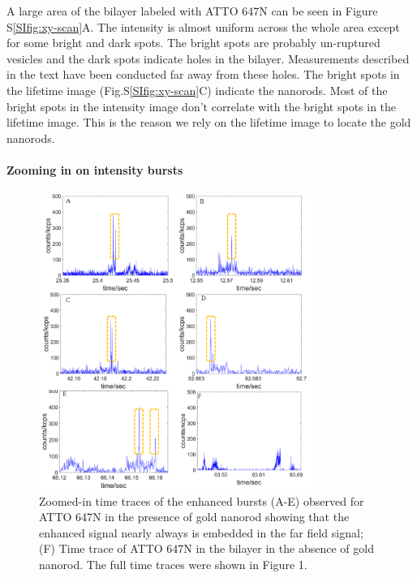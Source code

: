 A large area of the bilayer labeled with ATTO 647N can be seen in Figure S\ref{SIfig:xy-scan}A.
The intensity is almost uniform across the whole area except for some bright and dark spots.
The bright spots are probably un-ruptured vesicles and the dark spots indicate holes in the bilayer.
Measurements described in the text have been conducted far away from these holes.
The bright spots in the lifetime image (Fig.S\ref{SIfig:xy-scan}C) indicate the nanorods.
Most of the bright spots in the intensity image don't correlate with the bright spots in the lifetime image.
This is the reason we rely on the lifetime image to locate the gold nanorods.

\paragraph*{Zooming in on intensity bursts}
\begin{figure}%
  \centering
  \includegraphics[width=0.8\textwidth]{zoomed_traces}
  \makeatletter
  \renewcommand{\fnum@figure}{\figurename~S\thefigure}
  \makeatother{}
  \caption{Zoomed-in time traces of the enhanced bursts (A-E) observed for ATTO 647N in the presence of gold nanorod showing that the enhanced signal nearly always is embedded in the far field signal; (F) Time trace of ATTO 647N in the bilayer in the absence of gold nanorod.
  The full time traces were shown in Figure 1.}
  \label{SIfig:zoomed-trace}
\end{figure}

